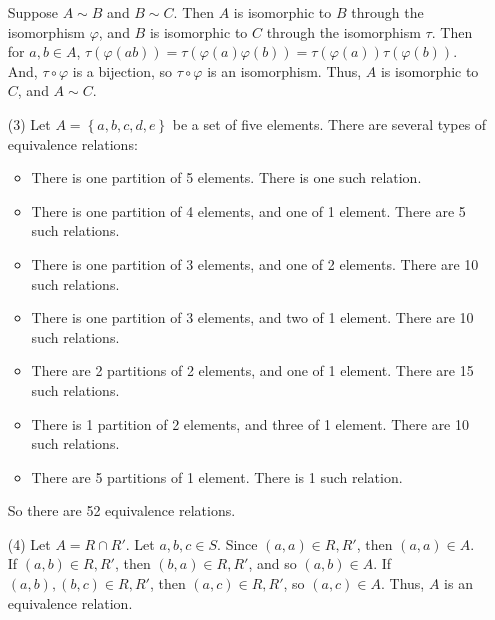 \begin{itemize}
Suppose $A \sim B$ and $B \sim C$. Then $A$ is isomorphic to $B$ through the isomorphism $\varphi$, and $B$ is isomorphic to $C$ through the isomorphism $\tau$. Then for $a, b \in A$, $\tau(\varphi(ab)) = \tau(\varphi(a)\varphi(b)) = \tau(\varphi(a))\tau(\varphi(b))$. And, $\tau \circ \varphi$ is a bijection, so $\tau \circ \varphi$ is an isomorphism. Thus, $A$ is isomorphic to $C$, and $A \sim C$.
\item[(3)]
Let $A = \left\lbrace a, b, c, d, e \right\rbrace$ be a set of five elements. There are several types of equivalence relations:
\begin{itemize}
\item
There is one partition of 5 elements. There is one such relation.
\item
There is one partition of 4 elements, and one of 1 element. There are 5 such relations.
\item
There is one partition of 3 elements, and one of 2 elements. There are 10 such relations.
\item
There is one partition of 3 elements, and two of 1 element. There are 10 such relations.
\item
There are 2 partitions of 2 elements, and one of 1 element. There are 15 such relations.
\item
There is 1 partition of 2 elements, and three of 1 element. There are 10 such relations.
\item
There are 5 partitions of 1 element. There is 1 such relation.
\end{itemize}
So there are 52 equivalence relations.
\item[(4)]
Let $A = R \cap R'$. Let $a, b, c \in S$. Since $(a, a) \in R, R'$, then $(a, a) \in A$. If $(a, b) \in R, R'$, then $(b, a) \in R, R'$, and so $(a, b) \in A$. If $(a, b), (b, c) \in R, R'$, then $(a, c) \in R, R'$, so $(a, c) \in A$. Thus, $A$ is an equivalence relation.


\end{itemize}
